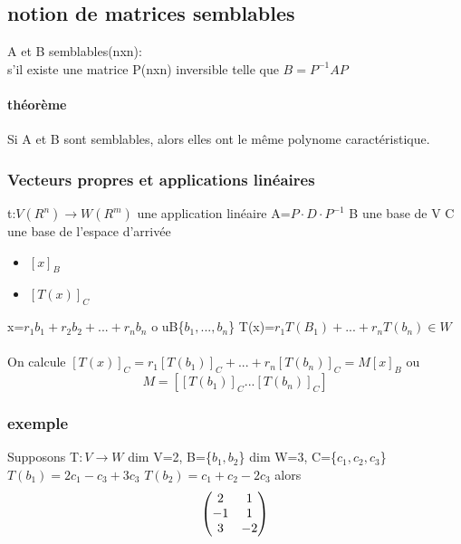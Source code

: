 \documentclass[a4paper,10pt]{article}
\begin{document}
\subsection{notion de matrices semblables}
\begin{description}
 \item A et B semblables(nxn):\\{s'il existe une matrice P(nxn) inversible telle que $B =P^{-1}AP$}
\end{description}
\paragraph{théorème}
Si A et B sont semblables, alors elles ont le même polynome caractéristique.
\subsubsection{Vecteurs propres et applications linéaires}
t:$V(R^n)\to W(R^m)$ une application linéaire A=$P\cdot D\cdot P^{-1}$
\newline
B une base de V
\newline
C une base de l'espace d'arrivée
\begin{itemize}
 \item $[x]_B$
 \item $[T(x)]_C$
\end{itemize}
x=$r_1b_1+r_2b_2+...+r_nb_n$ o uB\{$b_1,...,b_n$\}
\newline
T(x)=$r_1T(B_1)+...+r_nT(b_n)\in W$
\paragraph{}
On calcule $[T(x)]_C=r_1[T(b_1)]_C+...+r_n[T(b_n)]_C=M[x]_B$
\newline
ou
\newline
\[
M=[[T(b_1)]_C...[T(b_n)]_C]
\]
\subsubsection{exemple}
Supposons T$:V\to W$
\newline
dim V=2, B=\{$b_1,b_2$\}
\newline
dim W=3, C=\{$c_1,c_2,c_3$\}
\newline
$T(b_1)=2c_1-c_3+3c_3$
\newline
$T(b_2)=c_1+c_2-2c_3$
\newline
alors 
\newline
\[
\begin{pmatrix}
 2&1\cr
 -1&1\cr
 3&-2\cr
\end{pmatrix}
\]
\end{document}
